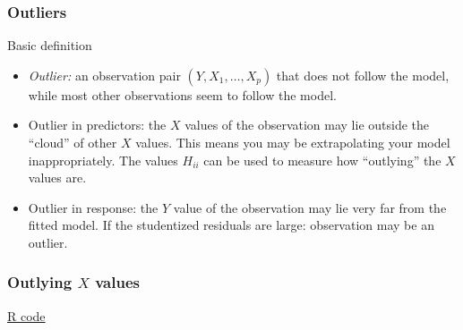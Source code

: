 \documentclass[handout]{beamer}
\begin{document}
   \begin{frame} \frametitle{Outliers}

   \begin{block}
   {Basic definition}
   \begin{itemize}[<+->]
   \item {\em Outlier:} an observation pair $(Y, X_1, \dots, X_p)$ that
   does not follow the model, while most other observations seem to follow the model.
   \item Outlier in predictors: the $X$ values of the observation may lie
   outside the ``cloud'' of other $X$ values. This means you may be extrapolating your model inappropriately. The values $H_{ii}$ can be used to measure
   how ``outlying'' the $X$ values are.

   \item Outlier in response: the $Y$ value of the observation may lie very far from the fitted model. If the studentized residuals are large: observation may be an outlier.
   \end{itemize}
   \end{block}
   \end{frame}



   \begin{frame}
   \frametitle{Outlying $X$ values}
   \begin{center}
   \end{center}
   \href{http://stats191.stanford.edu/diagnostics.html#hat-values}{R code}
   \end{frame}

\end{document}
